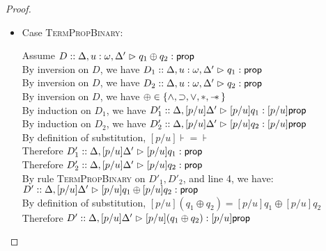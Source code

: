 \begin{proof}
\begin{enumerate}
\begin{itemize}
    \item Case \textsc{TermPropBinary}: 
      \begin{tabbedproof}
        \oo Assume $D :: \judgeA[\Delta, u:\omega, \Delta']{q_1 \oplus q_2}{\assert}$ \\
        \ooo By inversion on $D$, we have $D_1 :: \judgeA[\Delta, u:\omega, \Delta']{q_1}{\assert}$ \\
        \ooo By inversion on $D$, we have $D_2 :: \judgeA[\Delta, u:\omega, \Delta']{q_2}{\assert}$ \\
        \ooo By inversion on $D$, we have $\oplus \in \setof{\land, \implies, \vee, *, \wand}$ \\
        \ooo By induction on $D_1$, we have 
             $D'_1 :: \judgeA[{\Delta, [p/u]\Delta'}]{[p/u]q_1}{[p/u]\assert}$ \\
        \ooo By induction on $D_2$, we have 
             $D'_2 :: \judgeA[{\Delta, [p/u]\Delta'}]{[p/u]q_2}{[p/u]\assert}$ \\
        \ooo By definition of substitution, $[p/u]\assert = \assert$ \\
        \ooo Therefore $D'_1 :: \judgeA[{\Delta, [p/u]\Delta'}]{[p/u]q_1}{\assert}$ \\
        \ooo Therefore $D'_2 :: \judgeA[{\Delta, [p/u]\Delta'}]{[p/u]q_2}{\assert}$ \\
        \ooo By rule \textsc{TermPropBinary} on $D'_1, D'_2$, and line 4, we have: \\
        \oox \;\; $D' :: \judgeA[{\Delta, [p/u]\Delta'}]{[p/u]q_1 \oplus [p/u]q_2}{\assert}$ \\
        \ooo By definition of substitution, $[p/u](q_1 \oplus q_2) = [p/u]q_1 \oplus [p/u]q_2$ \\
        \ooo Therefore $D' :: \judgeA[{\Delta, [p/u]\Delta'}]{[p/u](q_1 \oplus q_2)}{[p/u]\assert}$ \\
      \end{tabbedproof}


\end{itemize}
\end{enumerate}
\end{proof}
